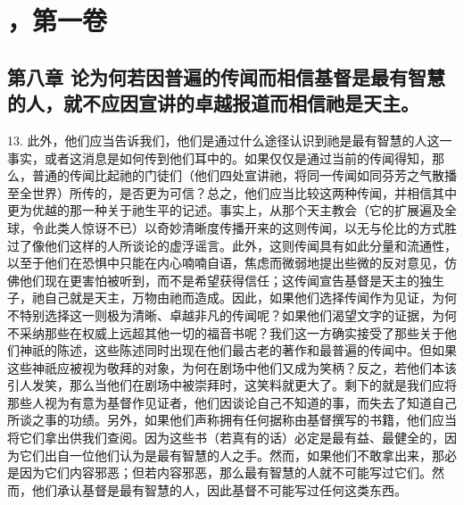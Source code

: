 

\section{，第一卷}


\subsection{第八章 论为何若因普遍的传闻而相信基督是最有智慧的人，就不应因宣讲的卓越报道而相信祂是天主。}

13. 此外，他们应当告诉我们，他们是通过什么途径认识到祂是最有智慧的人这一事实，或者这消息是如何传到他们耳中的。如果仅仅是通过当前的传闻得知，那么，普通的传闻比起祂的门徒们（他们四处宣讲祂，将同一传闻如同芬芳之气散播至全世界）所传的，是否更为可信？总之，他们应当比较这两种传闻，并相信其中更为优越的那一种关于祂生平的记述。事实上，从那个天主教会（它的扩展遍及全球，令此类人惊讶不已）以奇妙清晰度传播开来的这则传闻，以无与伦比的方式胜过了像他们这样的人所谈论的虚浮谣言。此外，这则传闻具有如此分量和流通性，以至于他们在恐惧中只能在内心喃喃自语，焦虑而微弱地提出些微的反对意见，仿佛他们现在更害怕被听到，而不是希望获得信任；这传闻宣告基督是天主的独生子，祂自己就是天主，万物由祂而造成。因此，如果他们选择传闻作为见证，为何不特别选择这一则极为清晰、卓越非凡的传闻呢？如果他们渴望文字的证据，为何不采纳那些在权威上远超其他一切的福音书呢？我们这一方确实接受了那些关于他们神祇的陈述，这些陈述同时出现在他们最古老的著作和最普遍的传闻中。但如果这些神祇应被视为敬拜的对象，为何在剧场中他们又成为笑柄？反之，若他们本该引人发笑，那么当他们在剧场中被崇拜时，这笑料就更大了。剩下的就是我们应将那些人视为有意为基督作见证者，他们因谈论自己不知道的事，而失去了知道自己所谈之事的功绩。另外，如果他们声称拥有任何据称由基督撰写的书籍，他们应当将它们拿出供我们查阅。因为这些书（若真有的话）必定是最有益、最健全的，因为它们出自一位他们认为是最有智慧的人之手。然而，如果他们不敢拿出来，那必是因为它们内容邪恶；但若内容邪恶，那么最有智慧的人就不可能写过它们。然而，他们承认基督是最有智慧的人，因此基督不可能写过任何这类东西。\par

